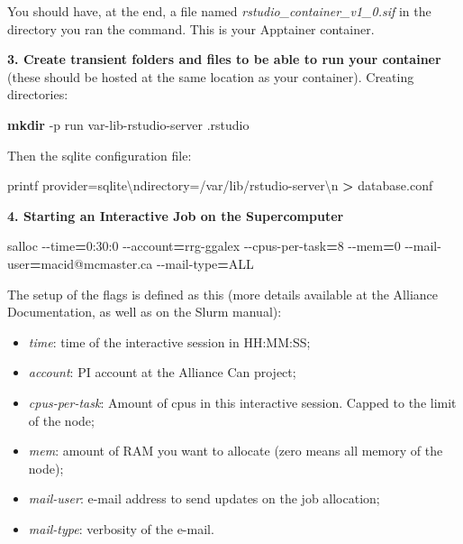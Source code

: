 \documentclass[
]{book}
\newenvironment{Shaded}{\begin{snugshade}}{\end{snugshade}}
\newcommand{\AttributeTok}[1]{\textcolor[rgb]{0.13,0.29,0.53}{#1}}
\newcommand{\BuiltInTok}[1]{#1}
\newcommand{\ExtensionTok}[1]{#1}
\newcommand{\FunctionTok}[1]{\textcolor[rgb]{0.13,0.29,0.53}{\textbf{#1}}}
\newcommand{\NormalTok}[1]{#1}
\newcommand{\OperatorTok}[1]{\textcolor[rgb]{0.81,0.36,0.00}{\textbf{#1}}}
\newcommand{\StringTok}[1]{\textcolor[rgb]{0.31,0.60,0.02}{#1}}
\providecommand{\tightlist}{%
  \setlength{\itemsep}{0pt}\setlength{\parskip}{0pt}}
\begin{document}
You should have, at the end, a file named \emph{rstudio\_container\_v1\_0.sif} in the
directory you ran the command. This is your Apptainer container.

\textbf{3. Create transient folders and files to be able to run your container} (these should be hosted at the same location as your container). Creating directories:

\begin{Shaded}
\begin{Highlighting}[]
\FunctionTok{mkdir} \AttributeTok{{-}p}\NormalTok{ run var{-}lib{-}rstudio{-}server .rstudio}
\end{Highlighting}
\end{Shaded}

Then the sqlite configuration file:

\begin{Shaded}
\begin{Highlighting}[]
\BuiltInTok{printf} \StringTok{\textquotesingle{}provider=sqlite\textbackslash{}ndirectory=/var/lib/rstudio{-}server\textbackslash{}n\textquotesingle{}} \OperatorTok{\textgreater{}}\NormalTok{ database.conf}
\end{Highlighting}
\end{Shaded}

\textbf{4. Starting an Interactive Job on the Supercomputer}

\begin{Shaded}
\begin{Highlighting}[]
\ExtensionTok{salloc} \AttributeTok{{-}{-}time}\OperatorTok{=}\NormalTok{0:30:0 }\AttributeTok{{-}{-}account}\OperatorTok{=}\NormalTok{rrg{-}ggalex }\AttributeTok{{-}{-}cpus{-}per{-}task}\OperatorTok{=}\NormalTok{8 }\AttributeTok{{-}{-}mem}\OperatorTok{=}\NormalTok{0 }\AttributeTok{{-}{-}mail{-}user}\OperatorTok{=}\NormalTok{macid@mcmaster.ca }\AttributeTok{{-}{-}mail{-}type}\OperatorTok{=}\NormalTok{ALL}
\end{Highlighting}
\end{Shaded}

The setup of the flags is defined as this (more details available at the Alliance Documentation, as well as on the Slurm manual):

\begin{itemize}
\tightlist
\item
  \emph{time}: time of the interactive session in HH:MM:SS;
\item
  \emph{account}: PI account at the Alliance Can project;
\item
  \emph{cpus-per-task}: Amount of cpus in this interactive session. Capped to the limit of the node;
\item
  \emph{mem}: amount of RAM you want to allocate (zero means all memory of the node);
\item
  \emph{mail-user}: e-mail address to send updates on the job allocation;
\item
  \emph{mail-type}: verbosity of the e-mail.
\end{itemize}
\end{document}
